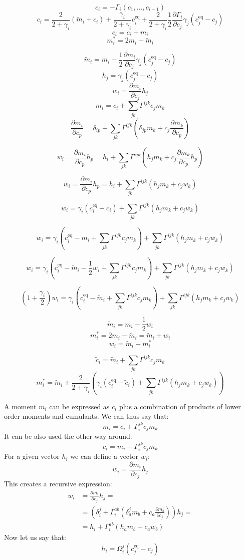 \documentclass{article}
\newcommand{\rr}[2]{\frac{\partial #1}{\partial #2}}
\newcommand{\eq}{\text{eq}}
\newcommand{\m}{\tilde{m}}
\renewcommand{\c}{\tilde{c}}
\begin{document}
\[c_i = - \Gamma_i(c_1,\ldots,c_{i-1}) \]
\[c_i = \frac{2}{2+\gamma_i}(\m_i + c_i) + \frac{\gamma_i}{2+\gamma_i}c^\eq_i + \frac{2}{2+\gamma_i}\frac{1}{2}\rr{\Gamma_i}{c_j}\gamma_j(c^\eq_j-c_j)\]
\[c_i = c_i + m_i\]
\[m_i^\ast = 2m_i - \m_i\]

\newpage

\[\m_i = m_i - \frac{1}{2}\rr{m_i}{c_j}\gamma_j(c^\eq_j-c_j)\]
\[h_j = \gamma_j(c^\eq_j-c_j)\]
\[w_i = \rr{m_i}{c_j}h_j\]
\[m_i = c_i + \sum_{jk}\Gamma^{ijk}c_jm_k\]
\[\rr{m_i}{c_p} = \delta_{ip} + \sum_{jk}\Gamma^{ijk}\left(\delta_{jp}m_k + c_j\rr{m_k}{c_p}\right)\]

\[w_i = \rr{m_i}{c_p}h_p = h_i + \sum_{jk}\Gamma^{ijk}\left(h_j m_k + c_j\rr{m_k}{c_p}h_p\right)\]

\[w_i = \rr{m_i}{c_p}h_p = h_i + \sum_{jk}\Gamma^{ijk}\left(h_j m_k + c_jw_k\right)\]

\[w_i = \gamma_i(c^\eq_i-c_i) + \sum_{jk}\Gamma^{ijk}\left(h_j m_k + c_jw_k\right)\]

\[w_i = \gamma_i(c^\eq_i-m_i + \sum_{jk}\Gamma^{ijk}c_jm_k) + \sum_{jk}\Gamma^{ijk}\left(h_j m_k + c_jw_k\right)\]

\[w_i = \gamma_i(c^\eq_i-\m_i-\frac{1}{2}w_i + \sum_{jk}\Gamma^{ijk}c_jm_k) + \sum_{jk}\Gamma^{ijk}\left(h_j m_k + c_jw_k\right)\]

\[(1+\frac{\gamma_i}{2})w_i = \gamma_i(c^\eq_i-\m_i + \sum_{jk}\Gamma^{ijk}c_jm_k) + \sum_{jk}\Gamma^{ijk}\left(h_j m_k + c_jw_k\right)\]


\[\m_i = m_i - \frac{1}{2}w_i\]
\[m_i^\ast = 2m_i - \m_i = \m_i+w_i\]
\[w_i = \m_i - m_i^\ast\]

\[\c_i = \m_i + \sum_{jk}\Gamma^{ijk}c_jm_k\]
\[m_i^\ast = \m_i+\frac{2}{2+\gamma_i}\left(\gamma_i(c^\eq_i-\c_i) + \sum_{jk}\Gamma^{ijk}\left(h_j m_k + c_jw_k\right)\right)\]

\newpage

A moment $m_i$ can be expressed as $c_i$ plus a combination of products of lower order moments and cumulants. We can thus say that:
\[m_i = c_i + \Gamma^{jk}_i c_j m_k\]
It can be also used the other way around:
\[c_i = m_i - \Gamma^{jk}_i c_j m_k\]
For a given vector $h_i$ we can define a vector $w_i$:
\[w_i = \rr{m_i}{c_j}h_j\]
This creates a recursive expression:
\begin{align*}w_i
&= \rr{m_i}{c_j}h_j =\\
&= \left(\delta_i^j + \Gamma^{ab}_i\left(\delta_a^j m_b + c_a\rr{m_b}{c_j}\right)\right)h_j=\\
&= h_i + \Gamma^{ab}_i \left(h_a m_b + c_a w_b\right)
\end{align*}
Now let us say that:
\[h_i = \Omega_i^j(c^\eq_j-c_j)\]
\end{document}

